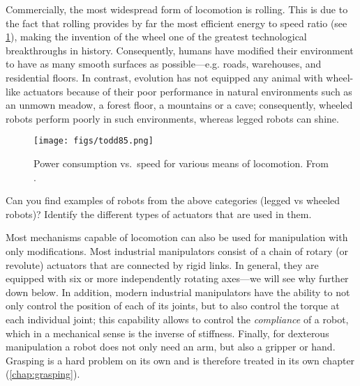 Commercially, the most widespread form of locomotion is rolling. This is due to the fact that rolling provides by far the most efficient energy to speed ratio (see \cref{fig:todd}), making the invention of the wheel one of the greatest technological breakthroughs in history. Consequently, humans have modified their environment to have as many smooth surfaces as possible---e.g. roads, warehouses, and residential floors.
%
In contrast, evolution has not equipped any animal with wheel-like actuators because of their poor performance in natural environments such as an unmown meadow, a forest floor, a mountains or a cave; consequently, wheeled robots perform poorly in such environments, whereas legged robots can shine.

\begin{figure}
    \centering
    \texttt{[image: figs/todd85.png]}
    \caption{Power consumption vs.\ speed for various means of locomotion. From \protect{}.}
    \label{fig:todd}
\end{figure}


\begin{mdframed}Can you find examples of robots from the above categories (legged vs wheeled robots)? Identify the different types of actuators that are used in them.
\end{mdframed}

Most mechanisms capable of locomotion can also be used for manipulation with only modifications. Most industrial manipulators consist of a chain of rotary (or revolute) actuators that are connected by rigid links. In general, they are equipped with six or more independently rotating axes---we will see why further down below. In addition, modern industrial manipulators have the ability to not only control the position of each of its joints, but to also control the torque at each individual joint; this capability allows to control the \textsl{compliance} of a robot, which in a mechanical sense is the inverse of stiffness. Finally, for dexterous manipulation a robot does not only need an arm, but also a gripper or hand. Grasping is a hard problem on its own and is therefore treated in its own chapter (\cref{chap:grasping}).


